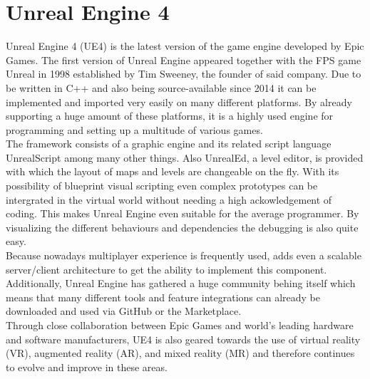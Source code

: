 \documentclass{report}
\begin{document}
	\section[Unreal Engine 4]{Unreal Engine 4 \textsc{\small{\cite{UE4}}}}	
		Unreal Engine 4 (UE4) is the latest version of the game engine developed by Epic Games. The first version of Unreal Engine appeared together with the FPS game Unreal in 1998 established by Tim Sweeney, the founder of said company. Due to be written in C++ and also being source-available since 2014 it can be implemented and imported very easily on many different platforms. By already supporting a huge amount of these platforms, it is a highly used engine for programming and setting up a multitude of various games. \\
		The framework consists of a graphic engine and its related script language UnrealScript among many other things. Also UnrealEd, a level editor, is provided with which the layout of maps and levels are changeable on the fly. With its possibility of blueprint visual scripting even complex prototypes can be intergrated in the virtual world without needing a high ackowledgement of coding. This makes Unreal Engine even suitable for the average programmer. By visualizing the different behaviours and dependencies the debugging is also quite easy. \\
		Because nowadays multiplayer experience is frequently used, adds even a scalable server/client architecture to get the ability to implement this component. Additionally, Unreal Engine has gathered a huge community behing itself which means that many different tools and feature integrations can already be downloaded and used via GitHub or the Marketplace. \\
		Through close collaboration between Epic Games and world's leading hardware and software manufacturers, UE4 is also geared towards the use of virtual reality (VR), augmented reality (AR), and mixed reality (MR) and therefore continues to evolve and improve in these areas.
\end{document}
